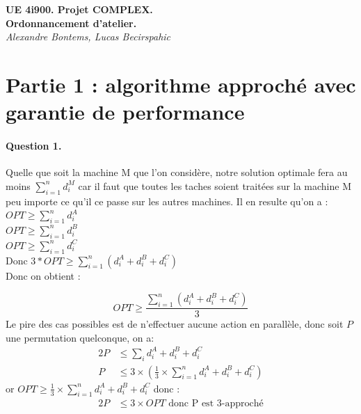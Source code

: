 \documentclass[a4paper, 10pt]{article}
\begin{document}
	\begin{center}
		\textbf{UE 4i900. Projet COMPLEX.}\\
		\textbf{Ordonnancement d'atelier.}\\[0.5cm]
		\textit{Alexandre Bontems, Lucas Becirspahic}
	\end{center}
	
	\section*{Partie 1 : algorithme approché avec garantie de performance}
	
	\paragraph{Question 1.}{%
          Quelle que soit la machine M que l'on considère, notre solution optimale fera au moins $\sum_{i=1}^nd_i^M$ car il faut que toutes les taches soient traitées sur la machine M peu importe ce qu'il ce passe sur les autres machines. Il en resulte qu'on a : \\
          $OPT \geq \sum_{i=1}^nd_i^A$  \\
          $OPT \geq \sum_{i=1}^nd_i^B$  \\
          $OPT \geq \sum_{i=1}^nd_i^C$  \\
          Donc $3*OPT \geq \sum_{i=1}^n(d_i^A + d_i^B + d_i^C)$\\
          Donc on obtient : 

       
		\begin{equation*}
			OPT \geq \frac{\sum_{i=1}^n \left( d_i^A + d_i^B + d_i^C \right)}{3}
		\end{equation*}
		Le pire des cas possibles est de n'effectuer aucune action en parallèle, donc soit $P$ une permutation quelconque, on a:
		\begin{alignat*}{2}
			P &\le \sum_{i} d_i^A + d_i^B + d_i^C \\
			P &\le 3 \times \left( \frac{1}{3} \times \sum_{i=1}^n d_i^A + d_i^B + d_i^C \right)
		\end{alignat*}
		or $OPT \geq \frac{1}{3} \times \sum_{i=1}^n d_i^A + d_i^B + d_i^C$ donc :
		\begin{alignat*}{2}
			P &\leq 3 \times OPT \text{ donc P est 3-approché}
		\end{alignat*}}
		
\end{document}
